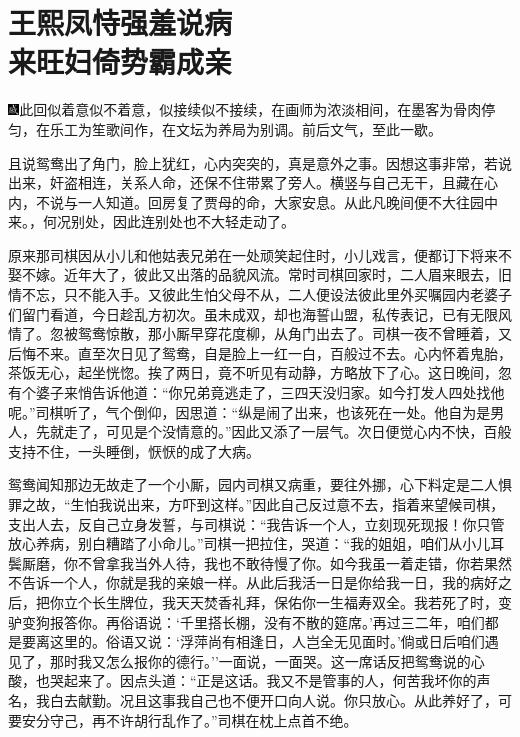 \chapter{王熙凤恃强羞说病\\来旺妇倚势霸成亲}

{\includegraphics[width=3mm]{../Images/00005}\kaishu 此回似着意似不着意，似接续似不接续，在画师为浓淡相间，在墨客为骨肉停匀，在乐工为笙歌间作，在文坛为养局为别调。前后文气，至此一歇。}

且说鸳鸯出了角门，脸上犹红，心内突突的，真是意外之事。因想这事非常，若说出来，奸盗相连，关系人命，还保不住带累了旁人。横竖与自己无干，且藏在心内，不说与一人知道。回房复了贾母的命，大家安息。从此凡晚间便不大往园中来。，何况别处，因此连别处也不大轻走动了。

原来那司棋因从小儿和他姑表兄弟在一处顽笑起住时，小儿戏言，便都订下将来不娶不嫁。近年大了，彼此又出落的品貌风流。常时司棋回家时，二人眉来眼去，旧情不忘，只不能入手。又彼此生怕父母不从，二人便设法彼此里外买嘱园内老婆子们留门看道，今日趁乱方初次。虽未成双，却也海誓山盟，私传表记，已有无限风情了。忽被鸳鸯惊散，那小厮早穿花度柳，从角门出去了。司棋一夜不曾睡着，又后悔不来。直至次日见了鸳鸯，自是脸上一红一白，百般过不去。心内怀着鬼胎，茶饭无心，起坐恍惚。挨了两日，竟不听见有动静，方略放下了心。这日晚间，忽有个婆子来悄告诉他道：``你兄弟竟逃走了，三四天没归家。如今打发人四处找他呢。''司棋听了，气个倒仰，因思道：``纵是闹了出来，也该死在一处。他自为是男人，先就走了，可见是个没情意的。''因此又添了一层气。次日便觉心内不快，百般支持不住，一头睡倒，恹恹的成了大病。

鸳鸯闻知那边无故走了一个小厮，园内司棋又病重，要往外挪，心下料定是二人惧罪之故，``生怕我说出来，方吓到这样。''因此自己反过意不去，指着来望候司棋，支出人去，反自己立身发誓，与司棋说：``我告诉一个人，立刻现死现报！你只管放心养病，别白糟踏了小命儿。''司棋一把拉住，哭道：``我的姐姐，咱们从小儿耳鬓厮磨，你不曾拿我当外人待，我也不敢待慢了你。如今我虽一着走错，你若果然不告诉一个人，你就是我的亲娘一样。从此后我活一日是你给我一日，我的病好之后，把你立个长生牌位，我天天焚香礼拜，保佑你一生福寿双全。我若死了时，变驴变狗报答你。再俗语说：`千里搭长棚，没有不散的筵席。'再过三二年，咱们都是要离这里的。俗语又说：`浮萍尚有相逢日，人岂全无见面时。'倘或日后咱们遇见了，那时我又怎么报你的德行。''一面说，一面哭。这一席话反把鸳鸯说的心酸，也哭起来了。因点头道：``正是这话。我又不是管事的人，何苦我坏你的声名，我白去献勤。况且这事我自己也不便开口向人说。你只放心。从此养好了，可要安分守己，再不许胡行乱作了。''司棋在枕上点首不绝。

